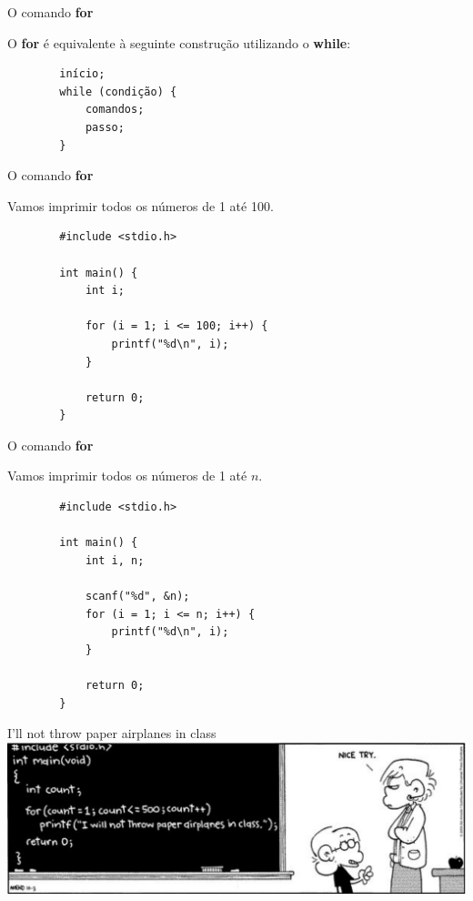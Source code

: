 \documentclass[handout]{beamer}
\begin{document}
\begin{frame}[fragile]{O comando {\bf for}}

    O {\bf for} é equivalente à seguinte construção utilizando o {\bf while}:

    \begin{verbatim}
        início;
        while (condição) {
            comandos;
            passo;
        }
    \end{verbatim}
\end{frame}

\begin{frame}[fragile]{O comando {\bf for}}

    Vamos imprimir todos os números de 1 até 100.

    \begin{verbatim}
        #include <stdio.h>

        int main() {
            int i;

            for (i = 1; i <= 100; i++) {
                printf("%d\n", i);
            }

            return 0;
        }
    \end{verbatim}
\end{frame}

\begin{frame}[fragile]{O comando {\bf for}}

    Vamos imprimir todos os números de 1 até $n$.

    \begin{verbatim}
        #include <stdio.h>

        int main() {
            int i, n;

            scanf("%d", &n);
            for (i = 1; i <= n; i++) {
                printf("%d\n", i);
            }

            return 0;
        }
    \end{verbatim}
\end{frame}

\begin{frame}{I'll not throw paper airplanes in class}
    \includegraphics[width=\textwidth]{figs/joke}
\end{frame}
\end{document}
